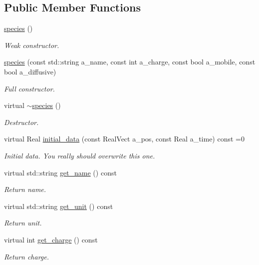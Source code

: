 \subsection*{Public Member Functions}
\begin{DoxyCompactItemize}
\item 
\hyperlink{classspecies_a25887c42dfb4b6f33a2d17fdcf74bc47}{species} ()
\begin{DoxyCompactList}\small\item\em Weak constructor. \end{DoxyCompactList}\item 
\hyperlink{classspecies_aaea8f4b450a04c5c236e45c61f9f2487}{species} (const std\+::string a\+\_\+name, const int a\+\_\+charge, const bool a\+\_\+mobile, const bool a\+\_\+diffusive)
\begin{DoxyCompactList}\small\item\em Full constructor. \end{DoxyCompactList}\item 
virtual \hyperlink{classspecies_a170757888475cb4814140eb31ead1c8b}{$\sim$species} ()
\begin{DoxyCompactList}\small\item\em Destructor. \end{DoxyCompactList}\item 
virtual Real \hyperlink{classspecies_a1c492560bb220c62985aaf6b20ff8ec2}{initial\+\_\+data} (const Real\+Vect a\+\_\+pos, const Real a\+\_\+time) const =0
\begin{DoxyCompactList}\small\item\em Initial data. You really should overwrite this one. \end{DoxyCompactList}\item 
virtual std\+::string \hyperlink{classspecies_a743486cbc991ee03714e9bb0a40b1b45}{get\+\_\+name} () const 
\begin{DoxyCompactList}\small\item\em Return name. \end{DoxyCompactList}\item 
virtual std\+::string \hyperlink{classspecies_a9ba54959e4179b87939522bc1624916c}{get\+\_\+unit} () const 
\begin{DoxyCompactList}\small\item\em Return unit. \end{DoxyCompactList}\item 
virtual int \hyperlink{classspecies_a0a8a4962f0968e206e47361acfabee99}{get\+\_\+charge} () const 
\begin{DoxyCompactList}\small\item\em Return charge. \end{DoxyCompactList}\item 

\end{DoxyCompactItemize}
